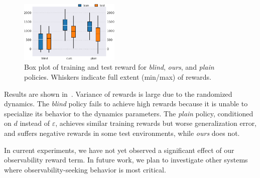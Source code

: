 \documentclass{article}
\newcommand{\sysid}{dynamics}
\newcommand{\blind}{\emph{blind}}
\newcommand{\plain}{\emph{plain}}
\newcommand{\embed}{\emph{ours}}
\newcommand{\idvar}{d}
\newcommand{\latvar}{\varepsilon}
\begin{document}
\begin{figure}
    \vspace{-0.75cm}
    \centering
    \includegraphics[width=0.4245\textwidth]{lastmain-crop.pdf}
    \caption{Box plot of training and test reward for \blind{}, \embed{}, and \plain{} policies.
    Whiskers indicate full extent (min/max) of rewards.}
    \label{cheetah-box}
\end{figure}

Results are shown in~.
Variance of rewards is large due to the randomized dynamics.
The \blind{} policy fails to achieve high rewards because it is unable to specialize its behavior to the \sysid{} parameters.
The \plain{} policy, conditioned on $\idvar$ instead of $\latvar$, achieves similar training rewards but worse generalization error,
and suffers negative rewards in some test environments, while \embed{} does not.

In current experiments, we have not yet observed a significant effect of our observability reward term.
In future work, we plan to investigate other systems where observability-seeking behavior is most critical.

\paragraph{}
\vspace*{-\parskip}

\end{document}
